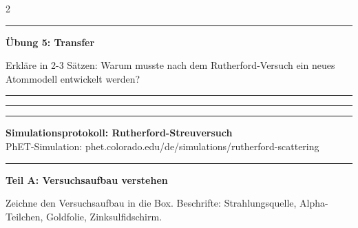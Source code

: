 \documentclass[10pt, a4paper]{article}
\newcommand{\fachfarbe}{physik}
\newcommand{\luecke}[1]{\rule{#1}{0.4pt}}
\newcommand{\abschnitt}[1]{%
    \vspace{8pt}
    \noindent\textbf{\textcolor{\fachfarbe}{#1}}
    \vspace{4pt}
}
\begin{document}
\begin{multicols}{2}
\begin{fehlerbox}
\begin{enumerate}[leftmargin=1.5em]
\vspace{4pt}
\luecke{5.5cm}
\end{enumerate}
\end{fehlerbox}

\vspace{8pt}


\abschnitt{Übung 5: Transfer}

Erkläre in 2-3 Sätzen: Warum musste nach dem Rutherford-Versuch ein neues Atommodell entwickelt werden?

\vspace{4pt}

\luecke{5.8cm}

\vspace{6pt}

\luecke{5.8cm}

\vspace{6pt}

\luecke{5.8cm}

\end{multicols}


\newpage

\begin{center}
{\large\bfseries Simulationsprotokoll: Rutherford-Streuversuch}\\[2pt]
{\small\textcolor{grau}{PhET-Simulation: phet.colorado.edu/de/simulations/rutherford-scattering}}
\end{center}

\vspace{-2pt}
\hrule
\vspace{12pt}


\abschnitt{Teil A: Versuchsaufbau verstehen}

\begin{merksatz}
Zeichne den Versuchsaufbau in die Box. Beschrifte: Strahlungsquelle, Alpha-Teilchen, Goldfolie, Zinksulfidschirm.

\vspace{80pt}

\end{merksatz}
\end{document}
